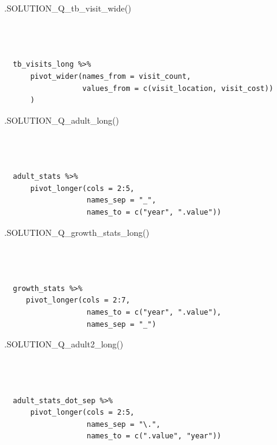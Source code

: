 \documentclass[
  letterpaper,
  DIV=11,
  numbers=noendperiod]{scrreprt}
\newenvironment{Shaded}{\begin{snugshade}}{\end{snugshade}}
\newcommand{\FunctionTok}[1]{\textcolor[rgb]{0.28,0.35,0.67}{#1}}
\newcommand{\NormalTok}[1]{\textcolor[rgb]{0.00,0.23,0.31}{#1}}
\begin{document}
\begin{Shaded}
\begin{Highlighting}[]
\FunctionTok{.SOLUTION\_Q\_tb\_visit\_wide}\NormalTok{()}
\end{Highlighting}
\end{Shaded}

\begin{verbatim}


  
  tb_visits_long %>%
      pivot_wider(names_from = visit_count,
                  values_from = c(visit_location, visit_cost))
      )
\end{verbatim}

\begin{Shaded}
\begin{Highlighting}[]
\FunctionTok{.SOLUTION\_Q\_adult\_long}\NormalTok{()}
\end{Highlighting}
\end{Shaded}

\begin{verbatim}


  
  adult_stats %>%
      pivot_longer(cols = 2:5,
                   names_sep = "_",
                   names_to = c("year", ".value"))
\end{verbatim}

\begin{Shaded}
\begin{Highlighting}[]
\FunctionTok{.SOLUTION\_Q\_growth\_stats\_long}\NormalTok{()}
\end{Highlighting}
\end{Shaded}

\begin{verbatim}


  
  growth_stats %>%
     pivot_longer(cols = 2:7,
                   names_to = c("year", ".value"),
                   names_sep = "_")
\end{verbatim}

\begin{Shaded}
\begin{Highlighting}[]
\FunctionTok{.SOLUTION\_Q\_adult2\_long}\NormalTok{()}
\end{Highlighting}
\end{Shaded}

\begin{verbatim}


  
  adult_stats_dot_sep %>%
      pivot_longer(cols = 2:5,
                   names_sep = "\.",
                   names_to = c(".value", "year"))
\end{verbatim}
\end{document}

